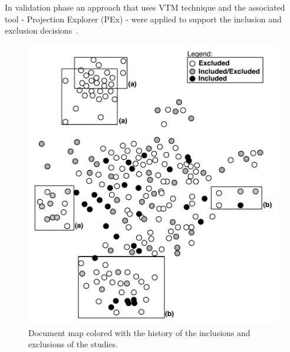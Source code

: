 In validation phase an approach that uses VTM technique and the associated tool - Projection Explorer (PEx) - were applied to support the inclusion and exclusion decisions~\cite{Malheiros:2007}. %

\begin{figure}[!h]
\centering
 \includegraphics[scale=0.40]{figuras/validation2}
\caption{Document map colored with the history of the inclusions and exclusions of the studies.}
\label{fig:validation}
\end{figure} 

